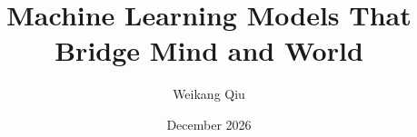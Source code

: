 \documentclass[12pt]{yalephd}
\begin{document}

	\title{Machine Learning Models That Bridge Mind and World}
	\author{Weikang Qiu}
	\committeechair{}
	\date{December 2026}

    \setcounter{page}{1}

    \maketitle       %
    \makecopyright   %


    \tableofcontents

    

    \listoffigures
    \listoftables

    \mainmatter      %

	
\end{document}
